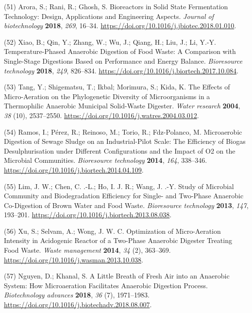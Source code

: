 \documentclass[11pt]{report}
\begin{document}
\hypertarget{citeproc_bib_item_51}{(51) Arora, S.; Rani, R.; Ghosh, S. Bioreactors in Solid State Fermentation Technology: Design, Applications and Engineering Aspects. \textit{Journal of biotechnology} \textbf{2018}, \textit{269}, 16–34. \url{https://doi.org/10.1016/j.jbiotec.2018.01.010}.}

\hypertarget{citeproc_bib_item_52}{(52) Xiao, B.; Qin, Y.; Zhang, W.; Wu, J.; Qiang, H.; Liu, J.; Li, Y.-Y. Temperature-Phased Anaerobic Digestion of Food Waste: A Comparison with Single-Stage Digestions Based on Performance and Energy Balance. \textit{Bioresource technology} \textbf{2018}, \textit{249}, 826–834. \url{https://doi.org/10.1016/j.biortech.2017.10.084}.}

\hypertarget{citeproc_bib_item_53}{(53) Tang, Y.; Shigematsu, T.; Ikbal; Morimura, S.; Kida, K. The Effects of Micro-Aeration on the Phylogenetic Diversity of Microorganisms in a Thermophilic Anaerobic Municipal Solid-Waste Digester. \textit{Water research} \textbf{2004}, \textit{38} (10), 2537–2550. \url{https://doi.org/10.1016/j.watres.2004.03.012}.}

\hypertarget{citeproc_bib_item_54}{(54) Ramos, I.; Pérez, R.; Reinoso, M.; Torio, R.; Fdz-Polanco, M. Microaerobic Digestion of Sewage Sludge on an Industrial-Pilot Scale: The Efficiency of Biogas Desulphurisation under Different Configurations and the Impact of O2 on the Microbial Communities. \textit{Bioresource technology} \textbf{2014}, \textit{164}, 338–346. \url{https://doi.org/10.1016/j.biortech.2014.04.109}.}

\hypertarget{citeproc_bib_item_55}{(55) Lim, J. W.; Chen, C. .-L.; Ho, I. J. R.; Wang, J. .-Y. Study of Microbial Community and Biodegradation Efficiency for Single- and Two-Phase Anaerobic Co-Digestion of Brown Water and Food Waste. \textit{Bioresource technology} \textbf{2013}, \textit{147}, 193–201. \url{https://doi.org/10.1016/j.biortech.2013.08.038}.}

\hypertarget{citeproc_bib_item_56}{(56) Xu, S.; Selvam, A.; Wong, J. W. C. Optimization of Micro-Aeration Intensity in Acidogenic Reactor of a Two-Phase Anaerobic Digester Treating Food Waste. \textit{Waste management} \textbf{2014}, \textit{34} (2), 363–369. \url{https://doi.org/10.1016/j.wasman.2013.10.038}.}

\hypertarget{citeproc_bib_item_57}{(57) Nguyen, D.; Khanal, S. A Little Breath of Fresh Air into an Anaerobic System: How Microaeration Facilitates Anaerobic Digestion Process. \textit{Biotechnology advances} \textbf{2018}, \textit{36} (7), 1971–1983. \url{https://doi.org/10.1016/j.biotechadv.2018.08.007}.}
\end{document}
